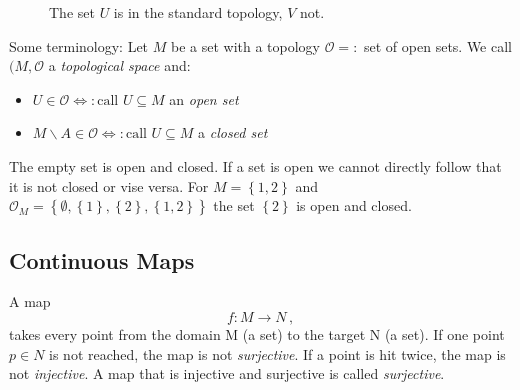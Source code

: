 \documentclass[11pt, a4paper, twocolumn]{article} %
\begin{document}
\begin{figure}[h]
\centering
{}
\caption{The set $U$ is in the standard topology, $V$ not.}
\end{figure}

Some terminology: Let $M$ be a set with a topology $\mathcal{O} =:$ set of open sets.
We call $(M, \mathcal{O}$ a \textit{topological space} and:
    \begin{itemize}
        \item $U \in \mathcal{O} \Leftrightarrow: \text{call } U\subseteq M$ an \textit{open set}
        \item $M\backslash A \in \mathcal{O} \Leftrightarrow: \text{call } U\subseteq M$  a \textit{closed set}
    \end{itemize}
\begin{note}
    The empty set is open and closed. If a set is open we cannot directly follow that it is not closed or vise versa. For $M = \left\{ 1, 2 \right\}$ and $\mathcal{O}_M = \left\{ \emptyset, \left\{ 1 \right\}, \left\{ 2 \right\}, \left\{ 1,2 \right\} \right\}$ the set $\left\{ 2 \right\}$ is open and closed.
\end{note}

\subsection{Continuous Maps}
A map
\begin{equation}
    f: M \to N\,,
\end{equation}
takes every point from the domain M (a set) to the target N (a set).
If one point $p\in N$ is not reached, the map is not \textit{surjective}.
If a point is hit twice, the map is not \textit{injective}.
A map that is injective and surjective is called \textit{surjective}.
\end{document}
